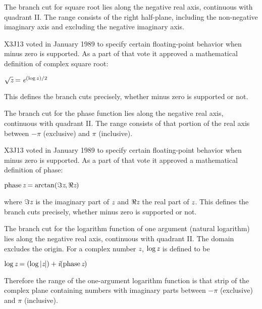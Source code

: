 \begin{flushdesc}
\item[\cdf{sqrt}]
The branch cut for square root lies along the negative real axis,
continuous with quadrant II.
The range consists of the right half-plane, including the non-negative
imaginary axis and excluding the negative imaginary axis.

\begin{new}
X3J13 voted in January 1989
to specify certain floating-point behavior when minus zero is supported.
As a part of that vote it approved a mathematical definition of complex square root:
\begin{tabbing}
$ \sqrt{\emph{z}} = \emph{e}^{(\log z)/2} $
\end{tabbing}
This defines the branch cuts precisely, whether minus zero is supported or not.
\end{new}

\item[\cdf{phase}]
The branch cut for the phase function lies along the negative real
axis, continuous with quadrant II.  The range consists of that portion of
the real axis between $-\pi$ (exclusive) and $\pi$ (inclusive).

\begin{new}
X3J13 voted in January 1989
to specify certain floating-point behavior when minus zero is supported.
As a part of that vote it approved a mathematical definition of phase:
\begin{tabbing}
$ \mathop\textrm{phase}\nolimits \emph{z} = \arctan (\Im \emph{z}, \Re \emph{z}) $
\end{tabbing}
where $\Im \emph{z}$ is the imaginary part of $\emph{z}$ and $\Re \emph{z}$ the real part of $\emph{z}$.
This defines the branch cuts precisely, whether minus zero is supported or not.
\end{new}

\item[\cdf{log}]
The branch cut for the logarithm function of one argument (natural
logarithm) lies along the negative real axis, continuous with quadrant II.
The domain excludes the origin.  For a complex number $\emph{z}$,
$\log \emph{z}$ is defined to be
\begin{tabbing}
$ \log \emph{z} = \left(\log \left|\emph{z}\right|\right)+\emph{i} (\mathop\textrm{phase}\nolimits \emph{z}) $
\end{tabbing}
Therefore the range of the one-argument logarithm function is that strip
of the complex plane containing numbers with imaginary parts between
$-\pi$ (exclusive) and $\pi$ (inclusive).


\end{flushdesc}
